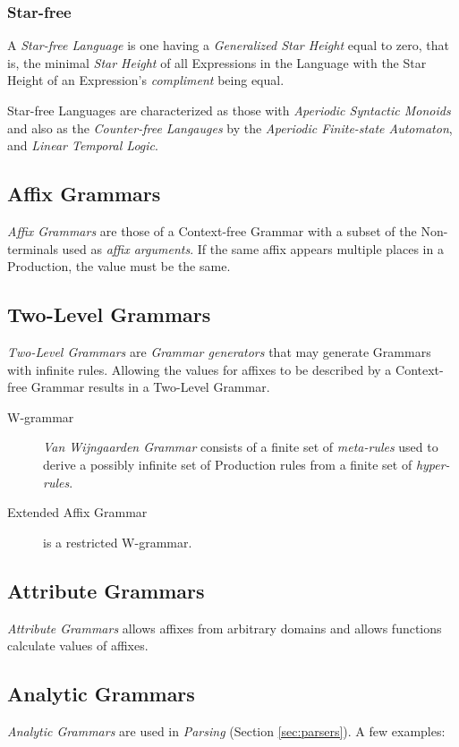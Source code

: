 \documentclass{article}
\begin{document}
\subsubsection{Star-free}
A \emph{Star-free Language} is one having a \emph{Generalized Star
  Height} equal to zero, that is, the minimal \emph{Star Height} of
all Expressions in the Language with the Star Height of an
Expression's \emph{compliment} being equal.

Star-free Languages are characterized as those with \emph{Aperiodic
  Syntactic Monoids}\cite{schutzenberger65} and also as the
\emph{Counter-free Langauges}\cite{mcnaughton-papert71} by the
\emph{Aperiodic Finite-state Automaton}, and \emph{Linear Temporal
  Logic}. %

\subsection{Affix Grammars}
\emph{Affix Grammars} are those of a Context-free Grammar with a
subset of the Non-terminals used as \emph{affix arguments}. If the
same affix appears multiple places in a Production, the value must be
the same.

\subsection{Two-Level Grammars}
\emph{Two-Level Grammars} are \emph{Grammar generators} that may
generate Grammars with infinite rules. Allowing the values for affixes
to be described by a Context-free Grammar results in a Two-Level
Grammar.


\begin{description}
\item[W-grammar] \emph{Van Wijngaarden Grammar} consists of a finite
  set of \emph{meta-rules} used to derive a possibly infinite set of
  Production rules from a finite set of \emph{hyper-rules}.
\item[Extended Affix Grammar] is a restricted W-grammar.
\end{description}

\subsection{Attribute Grammars}
\emph{Attribute Grammars} allows affixes from arbitrary domains and
allows functions calculate values of affixes.

\subsection{Analytic Grammars}
\emph{Analytic Grammars} are used in \emph{Parsing}
(Section \ref{sec:parsers}). A few examples:
\end{document}
